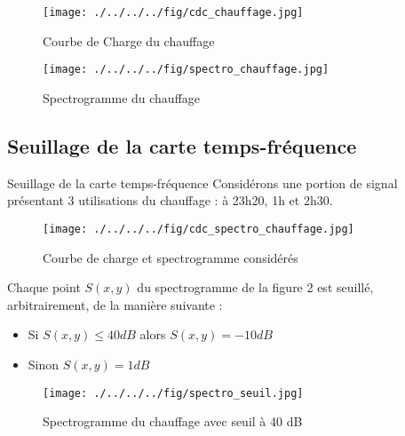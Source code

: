\documentclass{beamer}
\begin{document}
\begin{frame}

\begin{figure}[!h]
\begin{center}
\texttt{[image: ./../../../fig/cdc\_chauffage.jpg]}
\caption{Courbe de Charge du chauffage}
\label{Figure1}
\end{center}
\end{figure}

\begin{figure}[!h]
\begin{center}
\texttt{[image: ./../../../fig/spectro\_chauffage.jpg]}
\caption{Spectrogramme du chauffage}
\label{Figure2}
\end{center}
\end{figure}

\end{frame}

\subsection{Seuillage de la carte temps-fréquence}

\begin{frame}{Seuillage de la carte temps-fréquence}
Considérons une portion de signal présentant 3 utilisations du chauffage : à 23h20, 1h et 2h30.

\begin{figure}[!h]
\begin{center}
\texttt{[image: ./../../../fig/cdc\_spectro\_chauffage.jpg]}
\caption{Courbe de charge et spectrogramme considérés}
\label{Figure3}
\end{center}
\end{figure}
\end{frame}

\begin{frame}
Chaque point $S(x,y)$ du spectrogramme de la figure 2 est seuillé, arbitrairement, de la manière suivante :
\begin{itemize}
	\item Si $S(x,y) \le 40 dB$ alors $S(x,y) = -10 dB$
	\item Sinon $S(x,y) = 1 dB$
\end{itemize}

\begin{figure}[!h]
\begin{center}
\texttt{[image: ./../../../fig/spectro\_seuil.jpg]}
\caption{Spectrogramme du chauffage avec seuil à 40 dB}
\label{Figure4}
\end{center}
\end{figure}
\end{frame}
\end{document}

